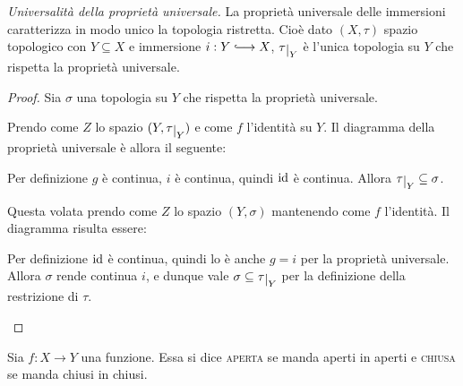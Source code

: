 \begin{thm}
    \emph{Universalit\`a della proprietà universale.} La proprietà universale
    delle immersioni caratterizza in modo unico la topologia ristretta. Cio\`e
    dato $(X, \tau)$ spazio topologico con $Y \subseteq X$ e immersione ${i: Y
    \hooklongrightarrow X}$, $\tau\restrict{Y}$ \`e l'unica topologia su $Y$ che
    rispetta la proprietà universale.
\end{thm}

\begin{proof}
    Sia $\sigma$ una topologia su $Y$ che rispetta la propriet\`a universale.
    \begin{nlist}
        \item Prendo come $Z$ lo spazio $(Y, \tau\restrict{Y})$ e come $f$
        l'identità su $Y$. Il diagramma della proprietà universale \`e allora il
        seguente:

        \begin{center}\end{center}

        Per definizione $g$ \`e continua, $i$ \`e continua, quindi $\operatorname{id}$ \`e
        continua. Allora $\tau\restrict{Y} \subseteq \sigma$.

        \item Questa volata prendo come $Z$ lo spazio $(Y, \sigma)$ mantenendo
        come $f$ l'identità. Il diagramma risulta essere:

        \begin{center}\end{center}

        Per definizione $\operatorname{id}$ \`e continua, quindi lo \`e anche $g=i$ per la
        propriet\`a universale. Allora $\sigma$ rende continua $i$, e dunque
        vale $\sigma \subseteq \tau\restrict{Y}$ per la definizione della
        restrizione di $\tau$.
    \end{nlist}
\end{proof}
\begin{defn}
    Sia $f:X\longrightarrow Y$ una funzione. Essa si dice \textsc{aperta} se
    manda aperti in aperti e \textsc{chiusa} se manda chiusi in chiusi.
\end{defn}

